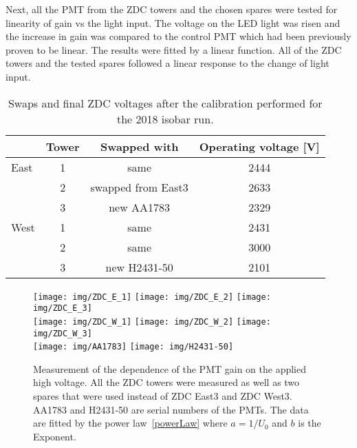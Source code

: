 Next, all the PMT from the ZDC towers and the chosen spares were tested for linearity of gain vs the light input. The voltage on the LED light was risen and the increase in gain was compared to the control PMT which had been previously proven to be linear. The results were fitted by a linear function. All of the ZDC towers and the tested spares followed a linear response to the change of light input.

\begin{table}[htb] 
\caption{\label{HVtable}Swaps and final ZDC voltages after the calibration performed for the 2018 isobar run.}
\label{corected}
\begin{center}
\begin{tabular}{lccc}
\toprule
 &Tower&Swapped with&Operating voltage [V]\\
\midrule
East  &1 & same & 2444 \\
      &2 & swapped from East3 & 2633 \\
      &3 & new AA1783 & 2329 \\
\midrule
West  &1 & same & 2431  \\
      &2 & same & 3000  \\
      &3 & new H2431-50 & 2101 \\
\bottomrule
\end{tabular}
\end{center}
\end{table}

\begin{figure}[!htb]
\texttt{[image: img/ZDC\_E\_1]}
\texttt{[image: img/ZDC\_E\_2]}
\texttt{[image: img/ZDC\_E\_3]}\\
\texttt{[image: img/ZDC\_W\_1]}
\texttt{[image: img/ZDC\_W\_2]}
\texttt{[image: img/ZDC\_W\_3]}\\
\texttt{[image: img/AA1783]}
\texttt{[image: img/H2431-50]}
\caption{\label{ZDCgains}Measurement of the dependence of the PMT gain on the applied high voltage. All the ZDC towers were measured as well as two spares that were used instead of ZDC East3 and ZDC West3\@. AA1783 and H2431-50 are serial numbers of the PMTs. The data are fitted by the power law~\eqref{powerLaw} where $a=1/U_0$ and $b$ is the Exponent.}
\end{figure}

